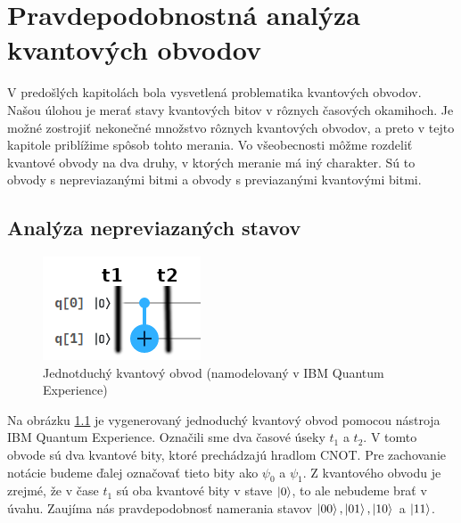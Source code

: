 
\chapter{Pravdepodobnostná analýza kvantových obvodov}

V predošlých kapitolách bola vysvetlená problematika kvantových obvodov.
Našou úlohou je merať stavy kvantových bitov v rôznych časových okamihoch.
Je možné zostrojiť nekonečné množstvo rôznych kvantových obvodov,
a preto v tejto kapitole priblížime spôsob tohto merania.
Vo všeobecnosti môžme rozdeliť kvantové obvody na dva druhy, v ktorých 
meranie má iný charakter. Sú to obvody s nepreviazanými bitmi a obvody s 
previazanými kvantovými bitmi.

\section{Analýza nepreviazaných stavov}

\begin{figure} 
	\centering 
	\includegraphics[width=.4\textwidth]{figures/simpleCircuit2.png} 
	\caption{Jednotduchý kvantový obvod (namodelovaný v IBM Quantum Experience)}
    \label{obvod}
\end{figure}

Na obrázku \ref{obvod} je vygenerovaný jednoduchý kvantový obvod pomocou
nástroja IBM Quantum Experience. Označili sme dva časové úseky 
\(t_1\) a \(t_2\). V tomto obvode sú dva kvantové bity, ktoré prechádzajú 
hradlom CNOT. Pre 
zachovanie notácie budeme ďalej označovať tieto bity ako 
\(\psi_0\) a \(\psi_1\). Z kvantového obvodu je zrejmé, že v čase \(t_1\) 
sú oba kvantové bity v stave
\(\ket{0}\), to ale nebudeme brať v úvahu. Zaujíma nás pravdepodobnosť 
namerania stavov \(\ket{00}, \ket{01}, \ket{10}\) a \(\ket{11}\).

